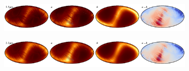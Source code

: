 \documentclass{aa}
\begin{document}
\begin{figure}
    \includegraphics[width=0.22\textwidth]{figs/zodi/zodi_03_tot.pdf}\includegraphics[width=0.22\textwidth]{figs/zodi/zodi_03_a.pdf}\includegraphics[width=0.22\textwidth]{figs/zodi/zodi_08_b.pdf}\includegraphics[width=0.22\textwidth]{figs/zodi/zodi_03_a-b.pdf}
    \vspace{-0.3cm}

    \includegraphics[width=0.22\textwidth]{figs/zodi/zodi_02_tot.pdf}\includegraphics[width=0.22\textwidth]{figs/zodi/zodi_02_a.pdf}\includegraphics[width=0.22\textwidth]{figs/zodi/zodi_09_b.pdf}\includegraphics[width=0.22\textwidth]{figs/zodi/zodi_02_a-b.pdf}
    \vspace{-0.3cm}


\end{figure}
\end{document}
